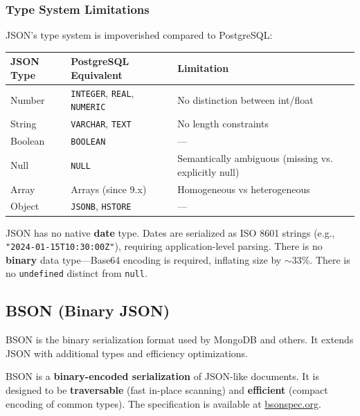 \documentclass[12pt,a4paper]{article}
\begin{document}
\subsubsection{Type System Limitations}

JSON's type system is impoverished compared to PostgreSQL:

\begin{center}
\begin{tabular}{@{}lll@{}}
\toprule
\textbf{JSON Type} & \textbf{PostgreSQL Equivalent} & \textbf{Limitation} \\
\midrule
Number & \texttt{INTEGER}, \texttt{REAL}, \texttt{NUMERIC} & No distinction between int/float \\
String & \texttt{VARCHAR}, \texttt{TEXT} & No length constraints \\
Boolean & \texttt{BOOLEAN} & --- \\
Null & \texttt{NULL} & Semantically ambiguous (missing vs. explicitly null) \\
Array & Arrays (since 9.x) & Homogeneous vs heterogeneous \\
Object & \texttt{JSONB}, \texttt{HSTORE} & --- \\
\bottomrule
\end{tabular}
\end{center}

\begin{rdbmsnote}
JSON has no native \textbf{date} type. Dates are serialized as ISO 8601 strings (e.g., \texttt{"2024-01-15T10:30:00Z"}), requiring application-level parsing. There is no \textbf{binary} data type---Base64 encoding is required, inflating size by $\sim$33\%. There is no \texttt{undefined} distinct from \texttt{null}.
\end{rdbmsnote}

\subsection{BSON (Binary JSON)}

BSON is the binary serialization format used by MongoDB and others. It extends JSON with additional types and efficiency optimizations.

\begin{definition}
BSON is a \textbf{binary-encoded serialization} of JSON-like documents. It is designed to be \textbf{traversable} (fast in-place scanning) and \textbf{efficient} (compact encoding of common types). The specification is available at \url{bsonspec.org}.
\end{definition}
\end{document}
